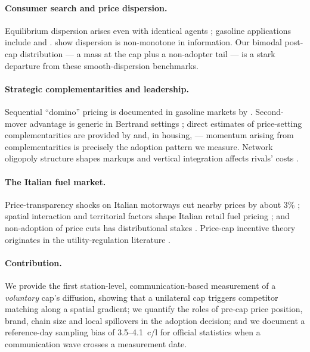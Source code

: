 \documentclass[11pt]{article}
\begin{document}
\paragraph{Consumer search and price dispersion.}
Equilibrium dispersion arises even with identical agents
\parencite{reinganum1979, stiglitz1982}; gasoline applications include
\textcite{chandra2011} and \textcite{noel2018}. \textcite{
pennerstorfer2020} show dispersion is non-monotone in information. Our
bimodal post-cap distribution --- a mass at the cap plus a non-adopter
tail --- is a stark departure from these smooth-dispersion benchmarks.

\paragraph{Strategic complementarities and leadership.}
Sequential ``domino'' pricing is documented in gasoline markets by
\textcite{atkinson2008}. Second-mover advantage is generic in Bertrand
settings \parencite{amir2007}; direct estimates of price-setting
complementarities are provided by \textcite{amiti2016} and, in housing,
\textcite{guren2018} --- momentum arising from complementarities is
precisely the adoption pattern we measure. Network oligopoly structure
shapes markups \parencite{pellegrino2025} and vertical integration
affects rivals' costs \parencite{hastings2005, borenstein2002}.

\paragraph{The Italian fuel market.}
Price-transparency shocks on Italian motorways cut nearby prices by about
3\% \parencite{rossi2015}; spatial interaction and territorial factors
shape Italian retail fuel pricing \parencite{bergantino2020,
alderighi2015}; and non-adoption of price cuts has distributional stakes
\parencite{mattioli2023}. Price-cap incentive theory originates in the
utility-regulation literature \parencite{braeutigam1993, cabral1991}.

\paragraph{Contribution.}
We provide the first station-level, communication-based measurement of a
\emph{voluntary} cap's diffusion, showing that a unilateral cap triggers
competitor matching along a spatial gradient; we quantify the roles of
pre-cap price position, brand, chain size and local spillovers in the
adoption decision; and we document a reference-day sampling bias of
3.5--4.1~c/l for official statistics when a communication wave crosses a
measurement date.
\end{document}
